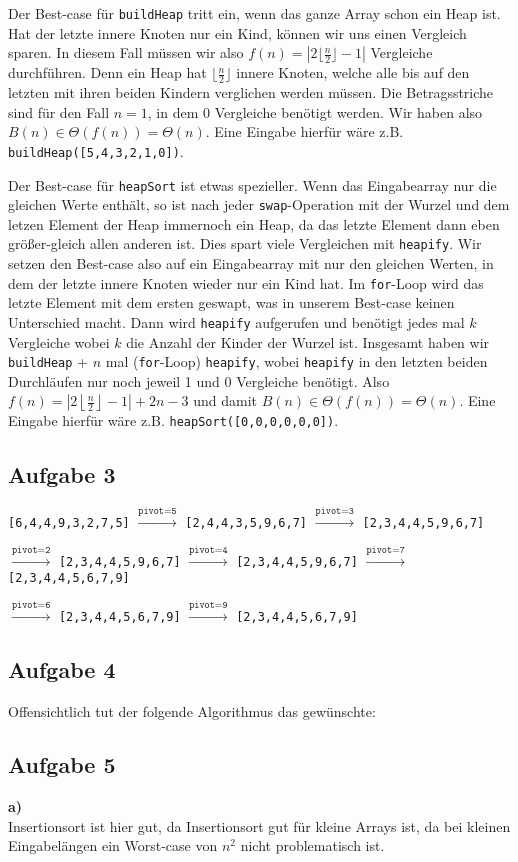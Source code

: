 \documentclass[a4paper,graphics,11pt]{article}
\newcommand{\aufgabe}[1]{\subsection*{Aufgabe #1}}
\begin{document}
Der Best-case für \texttt{buildHeap} tritt ein, wenn das ganze Array schon ein Heap ist.
Hat der letzte innere Knoten nur ein Kind, können wir uns einen Vergleich sparen. In diesem Fall müssen wir also
$f(n) = |2\lfloor \frac{n}{2} \rfloor-1|$ Vergleiche durchführen. Denn ein Heap hat $\lfloor \frac{n}{2} \rfloor$ innere
Knoten, welche alle bis auf den letzten mit ihren beiden Kindern verglichen werden müssen.
Die Betragsstriche sind für den Fall $n=1$, in dem 0 Vergleiche benötigt werden.
Wir haben also $B(n) \in \Theta(f(n)) = \Theta(n)$.
Eine Eingabe hierfür wäre z.B. \texttt{buildHeap([5,4,3,2,1,0])}.

Der Best-case für \texttt{heapSort} ist etwas spezieller. Wenn das Eingabearray nur die gleichen Werte enthält, so
ist nach jeder \texttt{swap}-Operation mit der Wurzel und dem letzen Element der Heap immernoch ein Heap, da das letzte
Element dann eben größer-gleich allen anderen ist.
Dies spart viele Vergleichen mit \texttt{heapify}.
Wir setzen den Best-case also auf ein Eingabearray mit nur den gleichen Werten,
in dem der letzte innere Knoten wieder nur ein Kind hat.
Im \texttt{for}-Loop wird das letzte Element mit dem ersten geswapt, was in unserem Best-case keinen Unterschied macht.
Dann wird \texttt{heapify} aufgerufen und benötigt jedes mal $k$ Vergleiche wobei $k$ die Anzahl der Kinder der Wurzel ist.
Insgesamt haben wir \texttt{buildHeap} + $n$ mal (\texttt{for}-Loop) \texttt{heapify},
wobei \texttt{heapify} in den letzten beiden Durchläufen nur noch jeweil 1 und 0 Vergleiche
benötigt. Also $ f(n) = \left|2\left\lfloor \frac{n}{2} \right\rfloor -1\right| + 2n - 3$
und damit $B(n) \in \Theta(f(n)) = \Theta(n)$.
Eine Eingabe hierfür wäre z.B. \texttt{heapSort([0,0,0,0,0,0])}.


\aufgabe{3}
\texttt{[6,4,4,9,3,2,7,5]} $\xrightarrow{\texttt{pivot=5}}$
\texttt{[2,4,4,3,5,9,6,7]} $\xrightarrow{\texttt{pivot=3}}$
\texttt{[2,3,4,4,5,9,6,7]}

$\xrightarrow{\texttt{pivot=2}}$ \texttt{[2,3,4,4,5,9,6,7]}
$\xrightarrow{\texttt{pivot=4}}$ \texttt{[2,3,4,4,5,9,6,7]}
$\xrightarrow{\texttt{pivot=7}}$ \texttt{[2,3,4,4,5,6,7,9]}

$\xrightarrow{\texttt{pivot=6}}$ \texttt{[2,3,4,4,5,6,7,9]}
$\xrightarrow{\texttt{pivot=9}}$ \texttt{[2,3,4,4,5,6,7,9]}

\aufgabe{4}
Offensichtlich tut der folgende Algorithmus das gewünschte:


\aufgabe{5}
\textbf{a)}\\
Insertionsort ist hier gut, da Insertionsort gut für kleine Arrays ist, da bei kleinen Eingabelängen
ein Worst-case von $n^2$ nicht problematisch ist.
\end{document}
